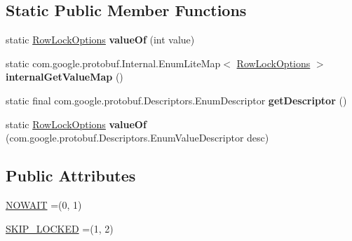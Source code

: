 \subsection*{Static Public Member Functions}
\begin{DoxyCompactItemize}
\item 
\mbox{\label{enumcom_1_1mysql_1_1cj_1_1x_1_1protobuf_1_1_mysqlx_crud_1_1_find_1_1_row_lock_options_a006113715ae82efcdb57e846d66724a6}} 
static \mbox{\hyperlink{enumcom_1_1mysql_1_1cj_1_1x_1_1protobuf_1_1_mysqlx_crud_1_1_find_1_1_row_lock_options}{Row\+Lock\+Options}} {\bfseries value\+Of} (int value)
\item 
\mbox{\label{enumcom_1_1mysql_1_1cj_1_1x_1_1protobuf_1_1_mysqlx_crud_1_1_find_1_1_row_lock_options_ae4c2b7364a7775f746d6ea7af3fa9b9f}} 
static com.\+google.\+protobuf.\+Internal.\+Enum\+Lite\+Map$<$ \mbox{\hyperlink{enumcom_1_1mysql_1_1cj_1_1x_1_1protobuf_1_1_mysqlx_crud_1_1_find_1_1_row_lock_options}{Row\+Lock\+Options}} $>$ {\bfseries internal\+Get\+Value\+Map} ()
\item 
\mbox{\label{enumcom_1_1mysql_1_1cj_1_1x_1_1protobuf_1_1_mysqlx_crud_1_1_find_1_1_row_lock_options_a4d583191b8a98a95e82d3e56dd61144c}} 
static final com.\+google.\+protobuf.\+Descriptors.\+Enum\+Descriptor {\bfseries get\+Descriptor} ()
\item 
\mbox{\label{enumcom_1_1mysql_1_1cj_1_1x_1_1protobuf_1_1_mysqlx_crud_1_1_find_1_1_row_lock_options_a73479ab59ac0fdb759529e51d273baaa}} 
static \mbox{\hyperlink{enumcom_1_1mysql_1_1cj_1_1x_1_1protobuf_1_1_mysqlx_crud_1_1_find_1_1_row_lock_options}{Row\+Lock\+Options}} {\bfseries value\+Of} (com.\+google.\+protobuf.\+Descriptors.\+Enum\+Value\+Descriptor desc)
\end{DoxyCompactItemize}
\subsection*{Public Attributes}
\begin{DoxyCompactItemize}
\item 
\mbox{\hyperlink{enumcom_1_1mysql_1_1cj_1_1x_1_1protobuf_1_1_mysqlx_crud_1_1_find_1_1_row_lock_options_a46bd28c80d8a1dbe711607733bb10867}{N\+O\+W\+A\+IT}} =(0, 1)
\item 
\mbox{\hyperlink{enumcom_1_1mysql_1_1cj_1_1x_1_1protobuf_1_1_mysqlx_crud_1_1_find_1_1_row_lock_options_a6d75989fe4e8d49f0ce557216bcbd8a0}{S\+K\+I\+P\+\_\+\+L\+O\+C\+K\+ED}} =(1, 2)
\end{DoxyCompactItemize}
